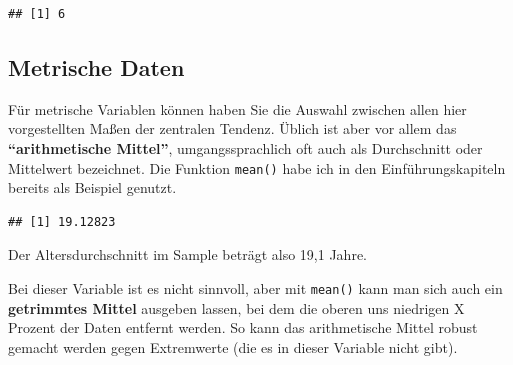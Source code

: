 \documentclass[
]{book}
\newenvironment{Shaded}{\begin{snugshade}}{\end{snugshade}}
\newcommand{\AttributeTok}[1]{\textcolor[rgb]{0.77,0.63,0.00}{#1}}
\newcommand{\ConstantTok}[1]{\textcolor[rgb]{0.00,0.00,0.00}{#1}}
\newcommand{\FloatTok}[1]{\textcolor[rgb]{0.00,0.00,0.81}{#1}}
\newcommand{\FunctionTok}[1]{\textcolor[rgb]{0.00,0.00,0.00}{#1}}
\newcommand{\NormalTok}[1]{#1}
\newcommand{\SpecialCharTok}[1]{\textcolor[rgb]{0.00,0.00,0.00}{#1}}
\begin{document}
\begin{Shaded}
\end{Shaded}

\begin{verbatim}
## [1] 6
\end{verbatim}

\hypertarget{metrische-daten}{%
\subsection{Metrische Daten}\label{metrische-daten}}

Für metrische Variablen können haben Sie die Auswahl zwischen allen hier vorgestellten Maßen der zentralen Tendenz. Üblich ist aber vor allem das \textbf{``arithmetische Mittel''}, umgangssprachlich oft auch als Durchschnitt oder Mittelwert bezeichnet. Die Funktion \texttt{mean()} habe ich in den Einführungskapiteln bereits als Beispiel genutzt.

\begin{Shaded}
\end{Shaded}

\begin{verbatim}
## [1] 19.12823
\end{verbatim}

Der Altersdurchschnitt im Sample beträgt also 19,1 Jahre.

Bei dieser Variable ist es nicht sinnvoll, aber mit \texttt{mean()} kann man sich auch ein \textbf{getrimmtes Mittel} ausgeben lassen, bei dem die oberen uns niedrigen X Prozent der Daten entfernt werden. So kann das arithmetische Mittel robust gemacht werden gegen Extremwerte (die es in dieser Variable nicht gibt).

\begin{Shaded}
\end{Shaded}
\end{document}
